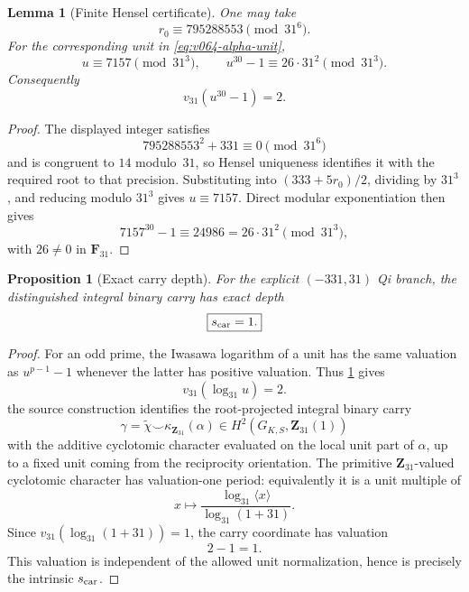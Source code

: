 \documentclass[11pt]{article}
\newtheorem{proposition}[theorem]{Proposition}
\newtheorem{lemma}[theorem]{Lemma}
\theoremstyle{remark}
\begin{document}
\begin{lemma}[Finite Hensel certificate]
\label{lem:v064-hensel-certificate}
One may take
\begin{equation}
 \boxed{
 r_0\equiv795288553\pmod{31^6}.}
 \label{eq:v064-hensel-root}
\end{equation}
For the corresponding unit in \eqref{eq:v064-alpha-unit},
\begin{equation}
 \boxed{
 u\equiv7157\pmod{31^3},
 \qquad
 u^{30}-1\equiv26\cdot31^2\pmod{31^3}.}
 \label{eq:v064-unit-certificate}
\end{equation}
Consequently
\begin{equation}
 \boxed{v_{31}(u^{30}-1)=2.}
 \label{eq:v064-unit-fermat-depth}
\end{equation}
\end{lemma}

\begin{proof}
The displayed integer satisfies
\[
 795288553^2+331\equiv0\pmod{31^6}
\]
and is congruent to \(14\) modulo~\(31\), so Hensel uniqueness identifies it
with the required root to that precision.  Substituting into
\((333+5r_0)/2\), dividing by \(31^3\), and reducing modulo \(31^3\) gives
\(u\equiv7157\).  Direct modular exponentiation then gives
\[
 7157^{30}-1\equiv24986=26\cdot31^2\pmod{31^3},
\]
with \(26\ne0\) in \(\mathbf F_{31}\).
\end{proof}

\begin{proposition}[Exact carry depth]
\label{prop:v064-exact-carry-depth}
For the explicit \((-331,31)\) Qi branch, the distinguished integral binary
carry has exact depth
\begin{equation}
 \boxed{s_{\rm car}=1.}
 \label{eq:v064-scar-one}
\end{equation}
\end{proposition}

\begin{proof}
For an odd prime, the Iwasawa logarithm of a unit has the same valuation as
\(u^{p-1}-1\) whenever the latter has positive valuation.  Thus
\cref{lem:v064-hensel-certificate} gives
\[
 v_{31}(\log_{31}u)=2.
\]
the source construction identifies the root-projected integral binary carry
\[
 \gamma
 =\widetilde\chi\smile\kappa_{\mathbf Z_{31}}(\alpha)
 \in H^2(G_{K,S},\mathbf Z_{31}(1))
\]
with the additive cyclotomic character evaluated on the local unit part of
\(\alpha\), up to a fixed unit coming from the reciprocity orientation.  The
primitive \(\mathbf Z_{31}\)-valued cyclotomic character has valuation-one
period: equivalently it is a unit multiple of
\[
 x\longmapsto
 \frac{\log_{31}\langle x\rangle}{\log_{31}(1+31)}.
\]
Since
\(v_{31}(\log_{31}(1+31))=1\), the carry coordinate has valuation
\[
 2-1=1.
\]
This valuation is independent of the allowed unit normalization, hence is
precisely the intrinsic \(s_{\rm car}\).
\end{proof}
\end{document}
